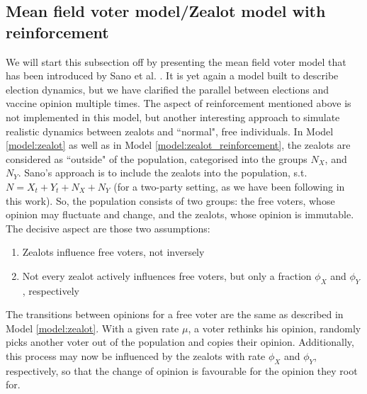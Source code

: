 \documentclass[12pt,a4paper,twoside]{article}
\begin{document}
\subsection{Mean field voter model/Zealot model with reinforcement}\label{subsec:sano_zealot_reinforcement}
We will start this subsection off by presenting the mean field voter model that has been introduced by Sano et al. \cite{Sano07122017}. It is yet again a model built to describe election dynamics, but we have clarified the parallel between elections and vaccine opinion multiple times. The aspect of reinforcement mentioned above is not implemented in this model, but another interesting approach to simulate realistic dynamics between zealots and ``normal", free individuals. In Model \ref{model:zealot} as well as in Model \ref{model:zealot_reinforcement}, the zealots are considered as ``outside" of the population, categorised into the groups $N_X$, and $N_Y$. Sano's approach is to include the zealots into the population, s.t. $N = X_t + Y_t + N_X + N_Y$ (for a two-party setting, as we have been following in this work). So, the population consists of two groups: the free voters, whose opinion may fluctuate and change, and the zealots, whose opinion is immutable. The decisive aspect are those two assumptions:
\begin{enumerate}
	\item Zealots influence free voters, not inversely
	\item Not every zealot actively influences free voters, but only a fraction $\phi_X$ and $\phi_Y$, respectively
\end{enumerate}
The transitions between opinions for a free voter are the same as described in Model \ref{model:zealot}. With a given rate $\mu$, a voter rethinks his opinion, randomly picks another voter out of the population and copies their opinion. Additionally, this process may now be influenced by the zealots with rate $\phi_X$ and $\phi_Y$, respectively, so that the change of opinion is favourable for the opinion they root for.
\end{document}
